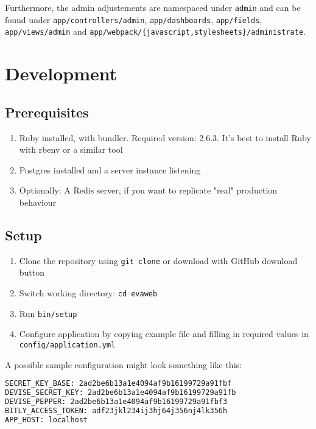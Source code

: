 \documentclass[11pt]{article}
\begin{document}
Furthermore, the admin adjustements are namespaced under \verb|admin|
and can be found under \verb|app/controllers/admin|, \verb|app/dashboards|, \verb|app/fields|, \verb|app/views/admin|
and \verb|app/webpack/{javascript,stylesheets}/administrate|.

\pagebreak
{}
\section{Development}
\subsection{Prerequisites}
\begin{enumerate}
	\item Ruby installed, with bundler. Required version: 2.6.3. It's best to install Ruby with rbenv or a similar tool
	\item Postgres installed and a server instance listening
	\item Optionally: A Redis server, if you want to replicate "real" production behaviour
\end{enumerate}

\subsection{Setup}
\begin{enumerate}
	\item Clone the repository using \verb|git clone| or download with GitHub download button
	\item Switch working directory: \verb|cd evaweb|
	\item Run \verb|bin/setup|
	\item Configure application by copying example file and filling in required values in \verb|config/application.yml|
\end{enumerate}

A possible sample configuration might look something like this:

\begin{lstlisting}[language=bash, caption={application.yml}]
SECRET_KEY_BASE: 2ad2be6b13a1e4094af9b16199729a91fbf
DEVISE_SECRET_KEY: 2ad2be6b13a1e4094af9b16199729a91fb
DEVISE_PEPPER: 2ad2be6b13a1e4094af9b16199729a91fbf3
BITLY_ACCESS_TOKEN: adf23jkl234ij3hj64j356nj4lk356h
APP_HOST: localhost
\end{lstlisting}
\end{document}
